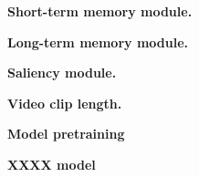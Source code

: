 \noindent\textbf{Short-term memory module.}

\noindent\textbf{Long-term memory module.}

\noindent\textbf{Saliency module.}

\noindent\textbf{Video clip length.}

\noindent\textbf{Model pretraining}

\noindent\textbf{XXXX model}
